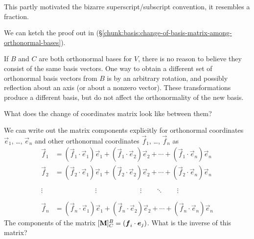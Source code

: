 This partly motivated the bizarre superscript/subscript convention, it
resembles a fraction.

We can ketch the proof out in (\S\ref{chunk:basis:change-of-basis-matrix-among-orthonormal-bases}).

If $B$ and $C$ are both orthonormal bases for $V$, there is no reason to
believe they consist of the same basis vectors. One way to obtain a
different set of orthonormal basis vectors from $B$ is by an arbitrary
rotation, and possibly reflection about an axis (or about a nonzero
vector). These transformations produce a different basis, but do not
affect the orthonormality of the new basis.

What does the change of coordinates matrix look like between them?

\M\label{chunk:basis:change-of-basis-matrix-among-orthonormal-bases}
We can write out the matrix components explicitly for orthonormal
coordinates $\vec{e}_{1}$, \dots, $\vec{e}_{n}$ and other orthonormal
coordinates $\vec{f}_{1}$, \dots, $\vec{f}_{n}$ as
\begin{align}
  \vec{f}_{1} &= (\vec{f}_{1}\cdot\vec{e}_{1})\vec{e}_{1} + (\vec{f}_{1}\cdot\vec{e}_{2})\vec{e}_{2} + \cdots + (\vec{f}_{1}\cdot\vec{e}_{n})\vec{e}_{n}\\
  \vec{f}_{2} &= (\vec{f}_{2}\cdot\vec{e}_{1})\vec{e}_{1} + (\vec{f}_{2}\cdot\vec{e}_{2})\vec{e}_{2} + \cdots + (\vec{f}_{2}\cdot\vec{e}_{n})\vec{e}_{n}\\
  \vdots &\mathrel{\phantom{=(\vec{f}_{2}\cdot\vec{e}_{1})}}\vdots\quad\phantom{+ (\vec{f}_{1}\cdot\vec{e}_{2})}\vdots\qquad\ddots\qquad\vdots\nonumber\\
  \vec{f}_{n} &= (\vec{f}_{n}\cdot\vec{e}_{1})\vec{e}_{1} + (\vec{f}_{n}\cdot\vec{e}_{2})\vec{e}_{2} + \cdots + (\vec{f}_{n}\cdot\vec{e}_{n})\vec{e}_{n}
\end{align}
The components of the matrix
$[\mathbf{M}]^{B}_{C}=(\boldsymbol{f}_{i}\cdot\boldsymbol{e}_{j})$.
What is the inverse of this matrix?

